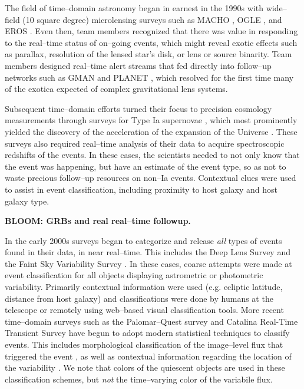  \smallskip

The field of time--domain astronomy began in earnest in the 1990s with
wide--field (10 square degree) microlensing surveys such as MACHO
\citep{2000ApJ...542..281A}, OGLE \citep{1994AcA....44..227U}, and EROS
\citep{2003A&A...400..951A}.   Even then, team members recognized that there was
value in responding to the real--time status of on--going events, which might
reveal exotic effects such as parallax, resolution of the lensed star's disk, or
lens or source binarity.  Team members designed real--time alert streams that
fed directly into follow--up networks such as GMAN \citep{2000PhDT.......258B}
and PLANET \citep{1998ApJ...509..687A}, which resolved for the first time many
of the exotica expected of complex gravitational lens systems.

Subsequent time--domain efforts turned their focus to precision cosmology
measurements through surveys for Type Ia supernovae \citep{1996AJ....112.2398H},
which most prominently yielded the discovery of the acceleration of the
expansion of the Universe \citep{1998AJ....116.1009R,1999ApJ...517..565P}. These
surveys also required real--time analysis of their data to acquire spectroscopic
redshifts of the events. In these cases, the scientists needed to not only know
that the event was happening, but have an estimate of the event type, so as not
to waste precious follow--up resources on non--Ia events.  Contextual clues were
used to assist in event classification, including proximity to host galaxy and
host galaxy type.

{\bf BLOOM: GRBs and real real--time followup.}

In the early 2000s surveys began to categorize and release {\it all} types of
events found in their data, in near real--time. This includes the Deep Lens
Survey \citep{Becker04a} and the Faint Sky Variability Survey
\citep{2003MNRAS.339..427G}.  In these cases, coarse attempts were made at event
classification for all objects displaying astrometric or photometric
variability. Primarily contextual information were used (e.g. ecliptic latitude,
distance from host galaxy) and classifications were done by humans at the
telescope or remotely using web--based visual classification tools.  More recent
time--domain surveys such as the Palomar--Quest survey
\citep{2008AN....329..263D} and Catalina Real-Time Transient Survey
\citep{2011arXiv1102.5004D} have begun to adopt modern statistical techniques to
classify events.  This includes morphological classification of the image--level
flux that triggered the event \citep{2008AIPC.1082..252D}, as well as contextual
information regarding the location of the variability
\citep{2010ASPC..434..115M}.  We note that colors of the quiescent objects are
used in these classification schemes, but {\it not} the time--varying color of
the variabile flux.

